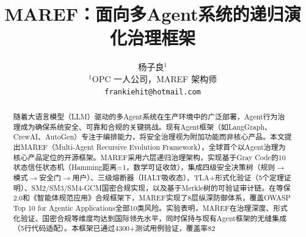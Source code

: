 \documentclass[10pt,twocolumn]{article}
\begin{document}
\title{\textbf{MAREF：面向多Agent系统的递归演化治理框架}}

\author{
\small 杨子良$^{1}$ \\
\small $^{1}$OPC 一人公司，MAREF 架构师 \\
\small \texttt{frankiehit@hotmail.com}
}

\date{}

\maketitle

\begin{abstract}
\noindent
随着大语言模型（LLM）驱动的多Agent系统在生产环境中的广泛部署，Agent行为治理成为确保系统安全、可靠和合规的关键挑战。现有Agent框架（如LangGraph、CrewAI、AutoGen）专注于编排能力，将安全治理视为附加功能而非核心产品。本文提出MAREF（Multi-Agent Recursive Evolution Framework），全球首个以Agent治理为核心产品定位的开源框架。MAREF采用六层递归治理架构，实现基于Gray Code的10状态信任状态机（Hamming距离=1，数学可证收敛），集成四级安全决策树（规则$\rightarrow$模式$\rightarrow$安全门$\rightarrow$用户）、三级熔断器（HALT吸收态）、TLA+形式化验证（5个定理证明）、SM2/SM3/SM4-GCM国密合规实现，以及基于Merkle树的可验证审计链。在等保2.0和《智能体规范应用》合规框架下，MAREF实现了8层纵深防御体系，覆盖OWASP Top 10 for Agentic Applications全部10类风险。实验表明，MAREF在治理深度、形式化验证、国密合规等维度均达到国际领先水平，同时保持与现有Agent框架的无缝集成（5行代码适配）。本框架已通过4300+测试用例验证，覆盖率82%

\end{abstract}
\end{document}
